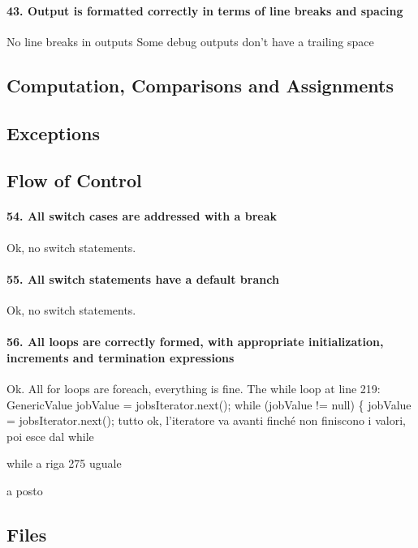 \documentclass[english]{article}
\begin{document}
\paragraph{43. Output is formatted correctly in terms of line breaks and spacing}
No line breaks in outputs
Some debug outputs don't have a trailing space ~

\subsection{Computation, Comparisons and Assignments}

\subsection{Exceptions}


\subsection{Flow of Control}
\paragraph{54. All switch cases are addressed with a break}
Ok, no switch statements.

\paragraph{55. All switch statements have a default branch}
Ok, no switch statements.

\paragraph{56. All loops are correctly formed, with appropriate initialization, increments and termination expressions}
Ok.
All for loops are foreach, everything is fine.
The while loop at line 219:
GenericValue jobValue = jobsIterator.next();
while (jobValue != null) \{
jobValue = jobsIterator.next();
tutto ok, l'iteratore va avanti finché non finiscono i valori, poi esce dal while

while a riga 275 uguale

a posto

\subsection{Files}
\end{document}
